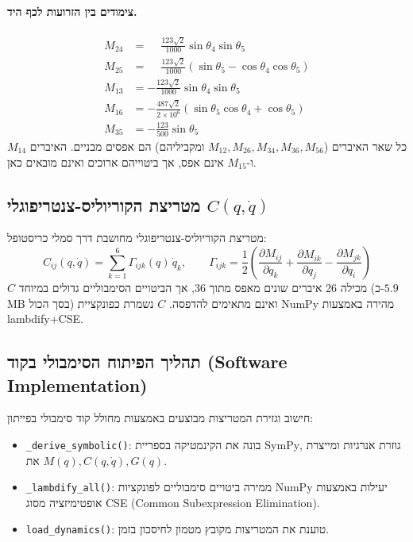 \documentclass[11pt,a4paper]{article}
\begin{document}
\paragraph{צימודים בין הזרועות לכף היד.}
\begin{align}
M_{24} &= \phantom{-}\frac{123\sqrt{2}}{1000}\sin\theta_4\sin\theta_5 \\
M_{25} &= \phantom{-}\frac{123\sqrt{2}}{1000}(\sin\theta_5 - \cos\theta_4\cos\theta_5) \\
M_{13} &= -\frac{123\sqrt{2}}{1000}\sin\theta_4\sin\theta_5 \\
M_{16} &= -\frac{487\sqrt{2}}{2\times10^6}(\sin\theta_5\cos\theta_4+\cos\theta_5) \\
M_{35} &= -\frac{123}{500}\sin\theta_5
\end{align}
כל שאר האיברים ($M_{12},M_{26},M_{34},M_{36},M_{56}$ ומקביליהם) הם אפסים מבניים. האיברים $M_{14}$ ו-$M_{15}$ אינם אפס, אך ביטוייהם ארוכים ואינם מובאים כאן.

\subsection{מטריצת הקוריוליס-צנטריפוגלי $C(q,\dot{q})$}
מטריצת הקוריוליס-צנטריפוגלי מחושבת דרך סמלי כריסטופל:
\begin{equation}
C_{ij}(q,\dot{q}) = \sum_{k=1}^{6} \Gamma_{ijk}(q)\,\dot{q}_k, \qquad
\Gamma_{ijk} = \frac{1}{2}\left(\frac{\partial M_{ij}}{\partial q_k} + \frac{\partial M_{ik}}{\partial q_j} - \frac{\partial M_{jk}}{\partial q_i}\right)
\end{equation}
$C$ מכילה 26 איברים שונים מאפס מתוך 36, אך הביטויים הסימבוליים גדולים במיוחד (כ-$5.9$ MB בסך הכול) ואינם מתאימים להדפסה. $C$ נשמרת כפונקציית \textenglish{NumPy} מהירה באמצעות \textenglish{lambdify+CSE}.

\subsection{תהליך הפיתוח הסימבולי בקוד (\textenglish{Software Implementation})}
חישוב וגזירת המטריצות מבוצעים באמצעות מחולל קוד סימבולי בפייתון:
\begin{itemize}
    \item \texttt{\_derive\_symbolic()}: בונה את הקינמטיקה בספריית \textenglish{SymPy}, גוזרת אנרגיות ומייצרת את $M(q), C(q, \dot{q}), G(q)$.
    \item \texttt{\_lambdify\_all()}: ממירה ביטויים סימבוליים לפונקציות \textenglish{NumPy} יעילות באמצעות אופטימיזציה מסוג \textenglish{CSE (Common Subexpression Elimination)}.
    \item \texttt{load\_dynamics()}: טוענת את המטריצות מקובץ מטמון לחיסכון בזמן.
\end{itemize}
\end{document}
